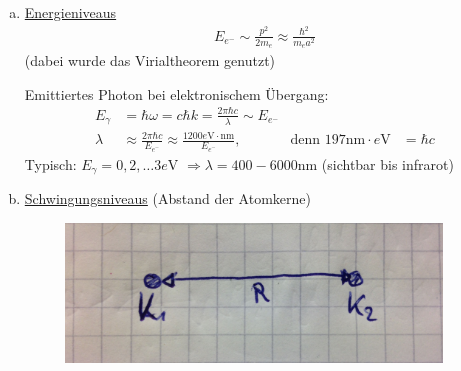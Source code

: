 	\begin{enumerate}[(a)]
	\item \underline{Energieniveaus}
			\begin{align*}
				E_{e^-} \sim \frac{p^2}{2m_e} \approx \frac{\hbar^2}{m_e a^2}
			\end{align*}
		(dabei wurde das Virialtheorem genutzt)
		
		Emittiertes Photon bei elektronischem Übergang:
			\begin{align*}
				E_\gamma &= \hbar \omega = c \hbar k = \frac{2 \pi \hbar c}{\lambda}
				\sim E_{e^-} \\
				\lambda &\approx \frac{2 \pi \hbar c}{E_{e^-}} \approx \frac{1200 e\mathrm{V} \cdot \mathrm{nm}}{E_{e^-}} ,&
				\text{denn } 197 \mathrm{nm}\cdot e\mathrm{V} &= \hbar c
			\end{align*}
		Typisch: $E_\gamma = 0, 2, \ldots 3 e$V $\Rightarrow \lambda = 400-6000$nm (sichtbar bis infrarot)
	\item \underline{Schwingungsniveaus} (Abstand der Atomkerne)
			\begin{figure} [h]
				\begin{center}
					\includegraphics[width=10cm]{Born-Oppenh_Approx1}
				\end{center}
			\end{figure}
			

\end{enumerate}

